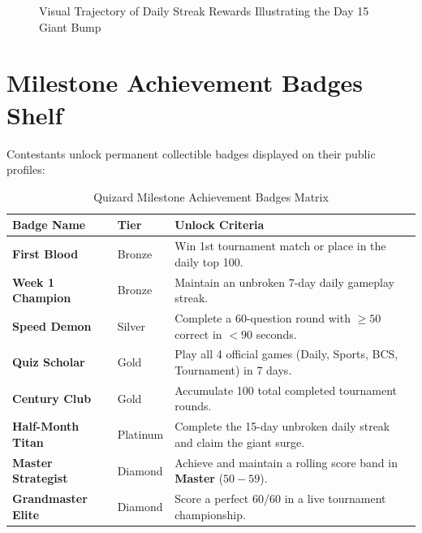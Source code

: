 \begin{figure}[htbp]
\centering
{}
\caption{Visual Trajectory of Daily Streak Rewards Illustrating the Day 15 Giant Bump}
\end{figure}

\section{Milestone Achievement Badges Shelf}
Contestants unlock permanent collectible badges displayed on their public profiles:

\begin{table}[htbp]
\centering
\small
\begin{tabular}{|l|l|p{6.8cm}|}
\hline
\rowcolor{primaryBlue!15}
\textbf{Badge Name} & \textbf{Tier} & \textbf{Unlock Criteria} \\ \hline
\textbf{First Blood} & Bronze & Win 1st tournament match or place in the daily top 100. \\ \hline
\textbf{Week 1 Champion} & Bronze & Maintain an unbroken 7-day daily gameplay streak. \\ \hline
\textbf{Speed Demon} & Silver & Complete a 60-question round with $\ge 50$ correct in $< 90$ seconds. \\ \hline
\textbf{Quiz Scholar} & Gold & Play all 4 official games (Daily, Sports, BCS, Tournament) in 7 days. \\ \hline
\textbf{Century Club} & Gold & Accumulate 100 total completed tournament rounds. \\ \hline
\textbf{Half-Month Titan}& Platinum & Complete the 15-day unbroken daily streak and claim the giant surge. \\ \hline
\textbf{Master Strategist}& Diamond & Achieve and maintain a rolling score band in \textbf{Master} ($50-59$). \\ \hline
\textbf{Grandmaster Elite}& Diamond & Score a perfect 60/60 in a live tournament championship. \\ \hline
\end{tabular}
\caption{Quizard Milestone Achievement Badges Matrix}
\end{table}

